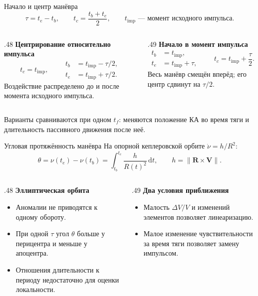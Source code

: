 \documentclass[11pt,aspectratio=169,t]{beamer}
\newcommand{\eqcompact}{\fontsize{10}{12}\selectfont}
\newcommand{\derivationmathspacing}{%
  \setlength{\abovedisplayskip}{2pt}%
  \setlength{\belowdisplayskip}{3pt}%
  \setlength{\abovedisplayshortskip}{2pt}%
  \setlength{\belowdisplayshortskip}{2pt}%
  \setlength{\jot}{2pt}}
\newcommand{\vect}[1]{\boldsymbol{#1}}
\begin{document}
\begin{frame}{Начало и центр манёвра}
\relax\derivationmathspacing
{\eqcompact\derivationmathspacing
\[
 \tau=t_e-t_b,\qquad t_c=\frac{t_b+t_e}{2},\qquad
 t_{\mathrm{imp}}\text{ --- момент исходного импульса}.
\]
}
\begin{columns}[T,onlytextwidth]
\begin{column}{.48\textwidth}
\textbf{Центрирование относительно импульса}
{\eqcompact\derivationmathspacing
\[
 t_c=t_{\mathrm{imp}},\qquad
 \boxed{\begin{aligned}
 t_b&=t_{\mathrm{imp}}-\tau/2,\\
 t_e&=t_{\mathrm{imp}}+\tau/2.
 \end{aligned}}
\]
}
Воздействие распределено до и после момента исходного импульса.
\end{column}
\begin{column}{.49\textwidth}
\textbf{Начало в момент импульса}
{\eqcompact\derivationmathspacing
\[
 \boxed{\begin{aligned}
 t_b&=t_{\mathrm{imp}},\\
 t_e&=t_{\mathrm{imp}}+\tau,
 \end{aligned}}\qquad
 t_c=t_{\mathrm{imp}}+\frac\tau2.
\]
}
Весь манёвр смещён вперёд; его центр сдвинут на $\tau/2$.
\end{column}
\end{columns}
\smallskip
Варианты сравниваются при одном $t_f$: меняются положение КА во время тяги и длительность пассивного движения после неё.
\end{frame}

\begin{frame}{Угловая протяжённость манёвра}
\relax\derivationmathspacing
На опорной кеплеровской орбите $\dot\nu=h/R^2$:
{\eqcompact\derivationmathspacing
\[
 \boxed{\theta=\nu(t_e)-\nu(t_b)
       =\int_{t_b}^{t_e}\frac{h}{R(t)^2}\,\mathrm dt,}
 \qquad h=\|\vect R\times\vect V\|.
\]
}
\begin{columns}[T,onlytextwidth]
\begin{column}{.48\textwidth}
\textbf{Эллиптическая орбита}
\begin{itemize}
\setlength{\itemsep}{3pt}
\item Аномалии не приводятся к одному обороту.
\item При одной $\tau$ угол $\theta$ больше у перицентра и меньше у апоцентра.
\item Отношения длительности к периоду недостаточно для оценки локальности.
\end{itemize}
\end{column}
\begin{column}{.49\textwidth}
\textbf{Два условия приближения}
\begin{itemize}
\setlength{\itemsep}{3pt}
\item Малость $\Delta V/V$ и изменений элементов позволяет линеаризацию.
\item Малое изменение чувствительности за время тяги позволяет замену импульсом.
\end{itemize}
\end{column}
\end{columns}
\end{frame}
\end{document}
